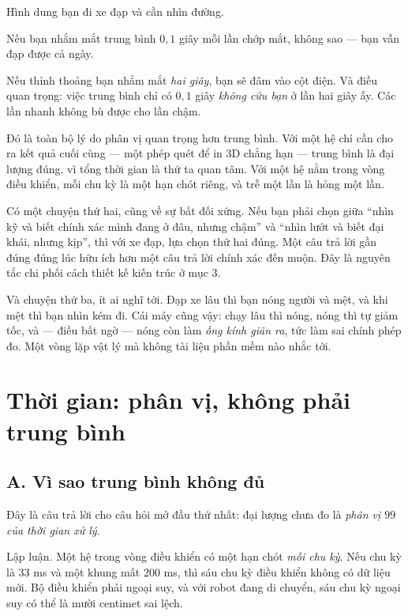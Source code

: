 \documentclass[../../vslam.tex]{subfiles}
\begin{document}
\begin{trucgiac}
Hình dung bạn đi xe đạp và cần nhìn đường.

Nếu bạn nhắm mắt trung bình \(0{,}1\) giây mỗi lần chớp mắt, không sao --- bạn vẫn đạp được cả ngày.

Nếu thỉnh thoảng bạn nhắm mắt \emph{hai giây}, bạn sẽ đâm vào cột điện. Và điều quan trọng: việc trung bình chỉ có \(0{,}1\) giây \emph{không cứu bạn} ở lần hai giây ấy. Các lần nhanh không bù được cho lần chậm.

Đó là toàn bộ lý do phân vị quan trọng hơn trung bình. Với một hệ chỉ cần cho ra kết quả cuối cùng --- một phép quét để in \(3\)D chẳng hạn --- trung bình là đại lượng đúng, vì tổng thời gian là thứ ta quan tâm. Với một hệ nằm trong vòng điều khiển, mỗi chu kỳ là một hạn chót riêng, và trễ một lần là hỏng một lần.

Có một chuyện thứ hai, cũng về sự bất đối xứng. Nếu bạn phải chọn giữa ``nhìn kỹ và biết chính xác mình đang ở đâu, nhưng chậm'' và ``nhìn lướt và biết đại khái, nhưng kịp'', thì với xe đạp, lựa chọn thứ hai đúng. Một câu trả lời gần đúng đúng lúc hữu ích hơn một câu trả lời chính xác đến muộn. Đây là nguyên tắc chi phối cách thiết kế kiến trúc ở mục 3.

Và chuyện thứ ba, ít ai nghĩ tới. Đạp xe lâu thì bạn nóng người và mệt, và khi mệt thì bạn nhìn kém đi. Cái máy cũng vậy: chạy lâu thì nóng, nóng thì tự giảm tốc, và --- điều bất ngờ --- nóng còn làm \emph{ống kính giãn ra}, tức làm sai chính phép đo. Một vòng lặp vật lý mà không tài liệu phần mềm nào nhắc tới.
\end{trucgiac}

\section{Thời gian: phân vị, không phải trung bình}

\subsection{A. Vì sao trung bình không đủ}

Đây là câu trả lời cho câu hỏi mở đầu thứ nhất: đại lượng chưa đo là \emph{phân vị \(99\) của thời gian xử lý}.

Lập luận. Một hệ trong vòng điều khiển có một hạn chót \emph{mỗi chu kỳ}. Nếu chu kỳ là \(33\) ms và một khung mất \(200\) ms, thì sáu chu kỳ điều khiển không có dữ liệu mới. Bộ điều khiển phải ngoại suy, và với robot đang di chuyển, sáu chu kỳ ngoại suy có thể là mười centimet sai lệch.
\end{document}
